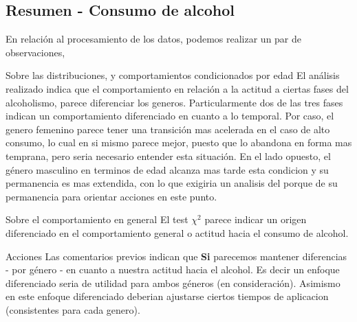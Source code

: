 \documentclass[8pt]{beamer}
\begin{document}
\subsection{Resumen - Consumo de alcohol}
\begin{frame}[shrink=10]
En relación al procesamiento de los datos, podemos realizar un par de observaciones,
\pause
\begin{block}{Sobre las distribuciones, y comportamientos condicionados por edad}
El análisis realizado indica que el comportamiento en relación a la actitud a ciertas fases del alcoholismo, parece diferenciar
los generos. Particularmente dos de las tres fases indican un comportamiento diferenciado en cuanto a lo temporal. Por caso, el genero
femenino parece tener una transición mas acelerada en el caso de alto consumo, lo cual en si mismo parece mejor, puesto que lo abandona en forma
mas temprana, pero seria necesario entender esta situación. En el lado opuesto, el género masculino en terminos de edad alcanza mas tarde esta condicion y su permanencia es mas extendida, con lo que exigiria un analisis del porque de su permanencia para orientar acciones en este punto.   
\end{block}

\pause
\begin{block}{Sobre el comportamiento en general}
El test $\chi^2$ parece indicar un origen diferenciado en el comportamiento general o actitud hacia el consumo de alcohol. 
\end{block} 

\pause
\begin{alertblock}{Acciones}
Las comentarios previos indican que \textbf{Si} parecemos mantener diferencias - por género - en cuanto a nuestra actitud hacia el alcohol. Es decir
un enfoque diferenciado seria de utilidad para ambos géneros (en consideración). Asimismo en este enfoque diferenciado deberian ajustarse ciertos tiempos de aplicacion (consistentes para cada genero).
\end{alertblock} 
\end{frame}
\end{document}

